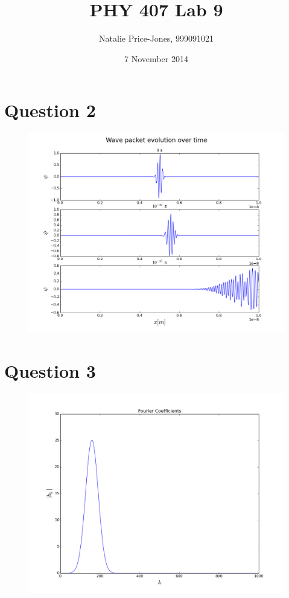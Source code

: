 \documentclass[a4paper,12pt]{article}
\begin{document}
\onehalfspacing
\title{PHY 407 Lab 9}
\author{Natalie Price-Jones, 999091021}
\date{7 November 2014}
\maketitle

\section{Question 2}

\begin{figure}[H]
\centering
\includegraphics[width = \linewidth]{lab9q2.png}
\caption{}
\label{fig:q2}
\end{figure}

\section{Question 3}

\begin{figure}[H]
\centering
\includegraphics[width = \linewidth]{lab9q3.png}
\caption{}
\label{fig:q3}
\end{figure}
\end{document}
